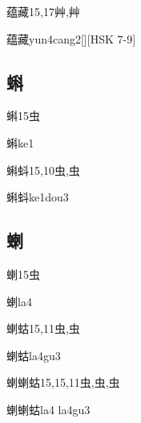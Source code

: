 \begin{Entry}{蕴藏}{15,17}{⾋,⾋}
  \begin{Phonetics}{蕴藏}{yun4cang2}[][HSK 7-9]
  \end{Phonetics}
\end{Entry}

\subsection*{蝌}

\begin{Entry}{蝌}{15}{⾍}
  \begin{Phonetics}{蝌}{ke1}
  \end{Phonetics}
\end{Entry}

\begin{Entry}{蝌蚪}{15,10}{⾍,⾍}
  \begin{Phonetics}{蝌蚪}{ke1dou3}
  \end{Phonetics}
\end{Entry}

\subsection*{蝲}

\begin{Entry}{蝲}{15}{⾍}
  \begin{Phonetics}{蝲}{la4}
  \end{Phonetics}
\end{Entry}

\begin{Entry}{蝲蛄}{15,11}{⾍,⾍}
  \begin{Phonetics}{蝲蛄}{la4gu3}
  \end{Phonetics}
\end{Entry}

\begin{Entry}{蝲蝲蛄}{15,15,11}{⾍,⾍,⾍}
  \begin{Phonetics}{蝲蝲蛄}{la4 la4gu3}
  \end{Phonetics}
\end{Entry}

